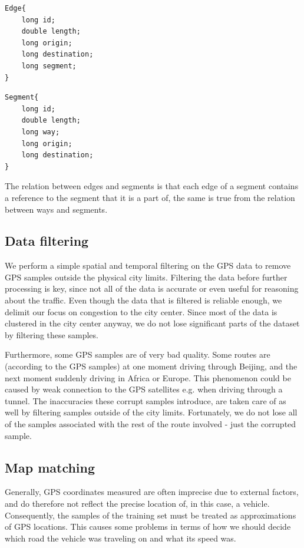 \begin{lstlisting}[style=java, caption=Datastructure for an edge]
Edge{
	long id;
	double length;
	long origin;
	long destination;
	long segment;
}
\end{lstlisting}

\begin{lstlisting}[style=java, caption=Datastructure for a segment]
Segment{
	long id;
	double length;
	long way;
	long origin;
	long destination;
}
\end{lstlisting}

The relation between edges and segments is that each edge of a segment contains a reference to the segment that it is a part of, the same is true from the relation between ways and segments.

\subsection{Data filtering}\label{sec:datafiltering}
We perform a simple spatial and temporal filtering on the GPS data to remove GPS samples outside the physical city limits. Filtering the data before further processing is key, since not all of the data is accurate or even useful for reasoning about the traffic. Even though the data that is filtered is reliable enough, we delimit our focus on congestion to the city center. Since most of the data is clustered in the city center anyway, we do not lose significant parts of the dataset by filtering these samples.

Furthermore, some GPS samples are of very bad quality. Some routes are (according to the GPS samples) at one moment driving through Beijing, and the next moment suddenly driving in Africa or Europe. This phenomenon could be caused by weak connection to the GPS satellites e.g. when driving through a tunnel. The inaccuracies these corrupt samples introduce, are taken care of as well by filtering samples outside of the city limits. Fortunately, we do not lose all of the samples associated with the rest of the route involved - just the corrupted sample.

\subsection{Map matching}\label{sec:mapmatching}
Generally, GPS coordinates measured are often imprecise due to external factors, and do therefore not reflect the precise location of, in this case, a vehicle. Consequently, the samples of the training set must be treated as approximations of GPS locations. This causes some problems in terms of how we should decide which road the vehicle was traveling on and what its speed was.

